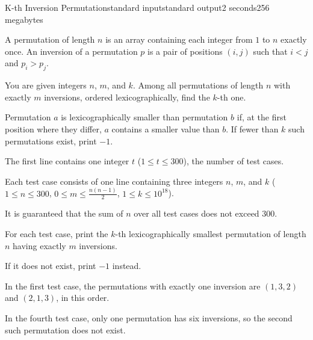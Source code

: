 \begin{problem}{K-th Inversion Permutation}{standard input}{standard output}{2 seconds}{256 megabytes}

A permutation of length $n$ is an array containing each integer from $1$ to $n$ exactly once.
An inversion of a permutation $p$ is a pair of positions $(i,j)$ such that $i<j$ and $p_i>p_j$.

You are given integers $n$, $m$, and $k$. Among all permutations of length $n$ with exactly $m$ inversions, ordered lexicographically, find the $k$-th one.

Permutation $a$ is lexicographically smaller than permutation $b$ if, at the first position where they differ, $a$ contains a smaller value than $b$.
If fewer than $k$ such permutations exist, print $-1$.


\InputFile
The first line contains one integer $t$ ($1 \le t \le 300$), the number of test cases.

Each test case consists of one line containing three integers $n$, $m$, and $k$ ($1 \le n \le 300$, $0 \le m \le \frac{n(n-1)}{2}$, $1 \le k \le 10^{18}$).

It is guaranteed that the sum of $n$ over all test cases does not exceed $300$.


\OutputFile
For each test case, print the $k$-th lexicographically smallest permutation of length $n$ having exactly $m$ inversions.

If it does not exist, print $-1$ instead.


\Examples

\begin{example}
%
%
\end{example}

\Note
In the first test case, the permutations with exactly one inversion are $(1,3,2)$ and $(2,1,3)$, in this order.

In the fourth test case, only one permutation has six inversions, so the second such permutation does not exist.


\end{problem}

